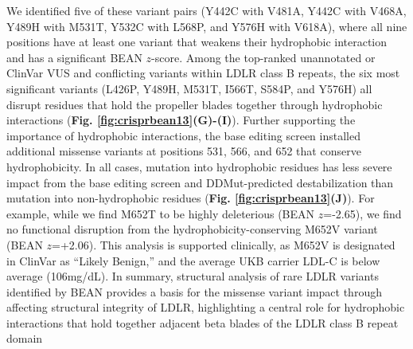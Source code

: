 \documentclass[a4paper, titlepage, openright]{book}
\begin{document}
We identified five of these variant pairs (Y442C with V481A, Y442C with V468A, Y489H with M531T, Y532C with L568P, and Y576H with V618A), where all nine positions have at least one variant that weakens their hydrophobic interaction and has a significant BEAN $z$-score. Among the top-ranked unannotated or ClinVar VUS and conflicting variants within LDLR class B repeats, the six most significant variants (L426P, Y489H, M531T, I566T, S584P, and Y576H) all disrupt residues that hold the propeller blades together through hydrophobic interactions (\textbf{Fig. \ref{fig:crisprbean13}(G)-(I)}). Further supporting the importance of hydrophobic interactions, the base editing screen installed additional missense variants at positions 531, 566, and 652 that conserve hydrophobicity. In all cases, mutation into hydrophobic residues has less severe impact from the base editing screen and DDMut-predicted destabilization than mutation into non-hydrophobic residues (\textbf{Fig. \ref{fig:crisprbean13}(J)}). For example, while we find M652T to be highly deleterious (BEAN $z$=-2.65), we find no functional disruption from the hydrophobicity-conserving M652V variant (BEAN $z$=+2.06). This analysis is supported clinically, as M652V is designated in ClinVar as “Likely Benign,” and the average UKB carrier LDL-C is below average (106mg/dL). In summary, structural analysis of rare LDLR variants identified by BEAN provides a basis for the missense variant impact through affecting structural integrity of LDLR, highlighting a central role for hydrophobic interactions that hold together adjacent beta blades of the LDLR class B repeat domain


\end{document}
